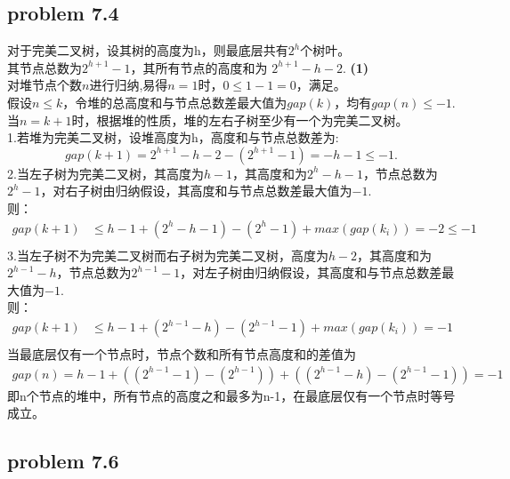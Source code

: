 \documentclass[11pt]{ctexart}
\begin{document}
{	\subsection*{problem 7.4}
	对于完美二叉树，设其树的高度为h，则最底层共有$2^h$个树叶。\\
	其节点总数为$2^{h+1}-1$，其所有节点的高度和为
	$2^{h+1}-h-2.$  \textbf{(1)}\\
	\hspace*{20pt}对堆节点个数$n$进行归纳,易得$n=1时，0\leq1-1=0$，满足。\\
		\hspace*{20pt}假设$n\leq k$，令堆的总高度和与节点总数差最大值为$gap(k)$，均有$gap(n)\leq-1.$\\
		\hspace*{20pt}当$n=k+1$时，根据堆的性质，堆的左右子树至少有一个为完美二叉树。\\
		\hspace*{20pt}1.若堆为完美二叉树，设堆高度为h，高度和与节点总数差为:\\
		$$
		gap(k+1)=2^{h+1}-h-2-(2^{h+1}-1)=-h-1\leq-1.
		$$
		\hspace*{20pt}2.当左子树为完美二叉树，其高度为$h-1$，其高度和为$2^{h}-h-1$，节点总数为$2^{h}-1$，对右子树由归纳假设，其高度和与节点总数差最大值为$-1$.\\
	则：$$\begin{aligned}
	gap(k+1)&\leq h-1+(2^{h}-h-1)-(2^{h}-1)+max(gap(k_i))=-2\leq -1\\
	\end{aligned}
	$$
	\hspace*{20pt}3.当左子树不为完美二叉树而右子树为完美二叉树，高度为$h-2$，其高度和为$2^{h-1}-h$，节点总数为$2^{h-1}-1$，对左子树由归纳假设，其高度和与节点总数差最大值为$-1$.\\
	则：
	$$\begin{aligned}
	gap(k+1)&\leq h-1+(2^{h-1}-h)-(2^{h-1}-1)+max(gap(k_i))=-1\\
	\end{aligned}
	$$
	\hspace*{20pt}当最底层仅有一个节点时，节点个数和所有节点高度和的差值为
	$$\begin{aligned}
	gap(n)=h-1+((2^{h-1}-1)-(2^{h-1}))+((2^{h-1}-h)-(2^{h-1}-1))=-1
	\end{aligned}
	$$
	\hspace*{20pt}即n个节点的堆中，所有节点的高度之和最多为n-1，在最底层仅有一个节点时等号成立。

	\subsection*{problem 7.6}	
}
\end{document}
